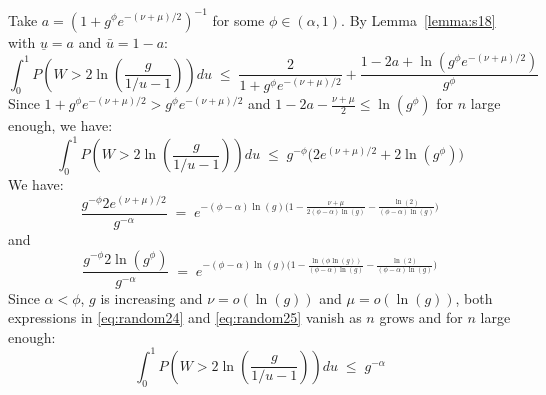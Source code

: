 \documentclass[aos]{imsart}
\theoremstyle{plain}
\begin{document}
Take $a=\left(1+g^{\phi}e^{-(\nu+\mu)/ 2}\right)^{-1}$ for some $\phi\in(\alpha,1)$. By Lemma~\ref{lemma:s18} with $\underline{u}=a$ and $\bar{u}=1-a$:
$$
\int_0^1 P\left(W>2 \ln \left(\frac{g}{1 / u-1}\right)\right) d u \;\leq\; \frac{2}{1+g^{\phi}e^{-(\nu+\mu)/2}}+ 
\frac{1-2a+\ln(g^{\phi}e^{-(\nu+\mu)/2})}{g^{\phi}} $$
Since $1+g^{\phi}e^{-(\nu+\mu)/ 2}>g^{\phi}e^{-(\nu+\mu)/ 2}$ and $1-2a-\frac{\nu+\mu}{2}\leq \ln(g^\phi)$ for $n$ large enough, we have:
$$
\int_0^1 P\left(W>2 \ln \left(\frac{g}{1 / u-1}\right)\right) d u \;\leq\; g^{-\phi}\big(2e^{(\nu+\mu)/ 2}+2\ln(g^{\phi})\big) $$
We have:
\begin{equation}\label{eq:random24}
    \frac{g^{-\phi}2e^{(\nu+\mu)/ 2}}{g^{-\alpha}} \;=\;e^{-(\phi-\alpha)\ln(g)\big(1-\frac{\nu+\mu}{2(\phi-\alpha)\ln(g)}- \frac{\ln(2)}{(\phi-\alpha)\ln(g)}\big)}
\end{equation}
and 
\begin{equation}\label{eq:random25}
    \frac{g^{-\phi}2\ln(g^{\phi})}{g^{-\alpha}} \;=\;e^{-(\phi-\alpha)\ln(g)\big(1-\frac{\ln(\phi\ln(g))}{(\phi-\alpha)\ln(g)}- \frac{\ln(2)}{(\phi-\alpha)\ln(g)}\big)}
\end{equation}
Since $\alpha<\phi$, $g$ is increasing and $\nu=o(\ln(g))$ and $\mu=o(\ln(g))$, both expressions in \eqref{eq:random24} and \eqref{eq:random25} vanish as $n$ grows and for $n$ large enough:
$$
\int_0^1 P\left(W>2 \ln \left(\frac{g}{1 / u-1}\right)\right) d u \;\leq\; g^{-\alpha}$$
\end{document}
